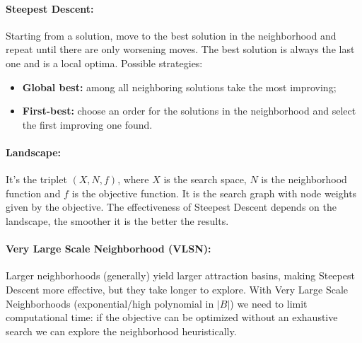\documentclass{article}
\begin{document}
	\paragraph{Steepest Descent:} Starting from a solution, move to the best solution in the neighborhood and repeat until there are only worsening moves. The best solution is always the last one and is a local optima. Possible strategies: 
	\begin{itemize}
		\item \textbf{Global best:} among all neighboring solutions take the most improving;
		\item \textbf{First-best:} choose an order for the solutions in the neighborhood and select the first improving one found.\\
	\end{itemize}
	
	\paragraph{Landscape:} It's the triplet $(X,N,f)$, where $X$ is the search space, $N$ is the neighborhood function and $f$ is the objective function. It is the search graph with node weights given by the objective. The effectiveness of Steepest Descent depends on the landscape, the smoother it is the better the results.\\
	
	\paragraph{Very Large Scale Neighborhood (VLSN):} Larger neighborhoods (generally) yield larger attraction basins, making Steepest Descent more effective, but they take longer to explore. With Very Large Scale Neighborhoods (exponential/high polynomial in $|B|$) we need to limit computational time: if the objective can be optimized without an exhaustive search we can explore the neighborhood heuristically.\\
	
\end{document}
